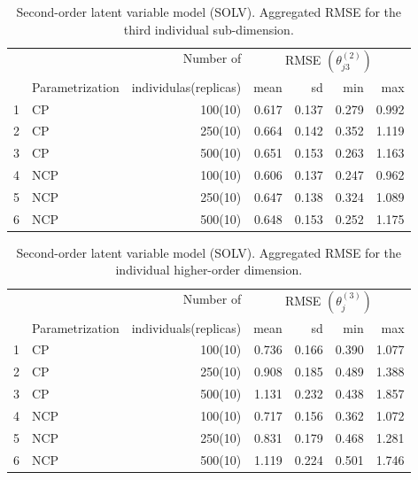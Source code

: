 %
\begin{table}[H]
	\centering
	\begin{tabular}{rlrrrrr}
		\hline
		\multicolumn{2}{c}{ } & Number of & \multicolumn{4}{c}{ RMSE $( \theta^{(2)}_{j3} )$ } \\ 
		\cmidrule(rl){4-7}
		& Parametrization & individulas(replicas) & mean & sd & min & max \\  
		\hline\hline
		1 & CP &  100(10) & 0.617 & 0.137 & 0.279 & 0.992 \\  
		2 & CP &  250(10) & 0.664 & 0.142 & 0.352 & 1.119 \\  
		3 & CP &  500(10) & 0.651 & 0.153 & 0.263 & 1.163 \\ 
		\hline
		4 & NCP &  100(10) & 0.606 & 0.137 & 0.247 & 0.962 \\ 
		5 & NCP &  250(10) & 0.647 & 0.138 & 0.324 & 1.089 \\ 
		6 & NCP &  500(10) & 0.648 & 0.153 & 0.252 & 1.175 \\   
		\hline
	\end{tabular}
	\caption[Second-order latent variable model (SOLV). Aggregated RMSE for the third individual sub-dimension.]%
	{Second-order latent variable model (SOLV). Aggregated RMSE for the third individual sub-dimension.}
	\label{tab:SOLV_RMSE_theta3}
\end{table}
%
\begin{table}[H]
	\centering
	\begin{tabular}{rlrrrrr}
		\hline
		\multicolumn{2}{c}{ } & Number of & \multicolumn{4}{c}{ RMSE $( \theta^{(3)}_{j} )$ } \\ 
		\cmidrule(rl){4-7}
		& Parametrization & individuals(replicas) & mean & sd & min & max \\  
		\hline\hline
		1 & CP &  100(10) & 0.736 & 0.166 & 0.390 & 1.077 \\ 
		2 & CP &  250(10) & 0.908 & 0.185 & 0.489 & 1.388 \\
		3 & CP &  500(10) & 1.131 & 0.232 & 0.438 & 1.857 \\ 
		\hline
		4 & NCP &  100(10) & 0.717 & 0.156 & 0.362 & 1.072 \\  
		5 & NCP &  250(10) & 0.831 & 0.179 & 0.468 & 1.281 \\
		6 & NCP &  500(10) & 1.119 & 0.224 & 0.501 & 1.746 \\   
		\hline
	\end{tabular}
	\caption[Second-order latent variable model (SOLV). Aggregated RMSE for the individual higher-order dimension.]%
	{Second-order latent variable model (SOLV). Aggregated RMSE for the individual higher-order dimension.}
	\label{tab:SOLV_RMSE_theta}
\end{table}
